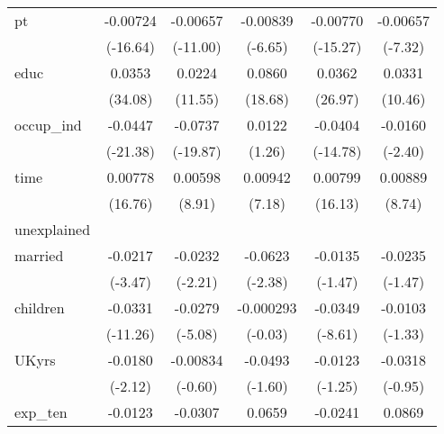 {\begin{longtable}{l*{5}{c}}
pt          &    -0.00724\sym{***}&    -0.00657\sym{***}&    -0.00839\sym{***}&    -0.00770\sym{***}&    -0.00657\sym{***}\\
            &    (-16.64)         &    (-11.00)         &     (-6.65)         &    (-15.27)         &     (-7.32)         \\
educ        &      0.0353\sym{***}&      0.0224\sym{***}&      0.0860\sym{***}&      0.0362\sym{***}&      0.0331\sym{***}\\
            &     (34.08)         &     (11.55)         &     (18.68)         &     (26.97)         &     (10.46)         \\
occup\_ind   &     -0.0447\sym{***}&     -0.0737\sym{***}&      0.0122         &     -0.0404\sym{***}&     -0.0160\sym{*}  \\
            &    (-21.38)         &    (-19.87)         &      (1.26)         &    (-14.78)         &     (-2.40)         \\
time        &     0.00778\sym{***}&     0.00598\sym{***}&     0.00942\sym{***}&     0.00799\sym{***}&     0.00889\sym{***}\\
            &     (16.76)         &      (8.91)         &      (7.18)         &     (16.13)         &      (8.74)         \\
\hline
unexplained &                     &                     &                     &                     &                     \\
married     &     -0.0217\sym{***}&     -0.0232\sym{*}  &     -0.0623\sym{*}  &     -0.0135         &     -0.0235         \\
            &     (-3.47)         &     (-2.21)         &     (-2.38)         &     (-1.47)         &     (-1.47)         \\
children    &     -0.0331\sym{***}&     -0.0279\sym{***}&   -0.000293         &     -0.0349\sym{***}&     -0.0103         \\
            &    (-11.26)         &     (-5.08)         &     (-0.03)         &     (-8.61)         &     (-1.33)         \\
UKyrs       &     -0.0180\sym{*}  &    -0.00834         &     -0.0493         &     -0.0123         &     -0.0318         \\
            &     (-2.12)         &     (-0.60)         &     (-1.60)         &     (-1.25)         &     (-0.95)         \\
exp\_ten     &     -0.0123         &     -0.0307\sym{*}  &      0.0659\sym{*}  &     -0.0241\sym{**} &      0.0869\sym{***}\\

\end{longtable}}
